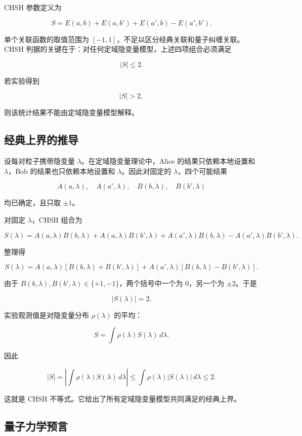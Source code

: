 \documentclass{zjureport}
\begin{document}
CHSH 参数定义为

\[
S=E(a,b)+E(a,b')+E(a',b)-E(a',b').
\]

单个关联函数的取值范围为 \([-1,1]\)，不足以区分经典关联和量子纠缠关联。CHSH 判据的关键在于：对任何定域隐变量模型，上述四项组合必须满足

\[
|S|\leq 2.
\]

若实验得到

\[
|S|>2,
\]

则该统计结果不能由定域隐变量模型解释。

\subsection{经典上界的推导}\label{ux7ecfux5178ux4e0aux754cux7684ux63a8ux5bfc}

设每对粒子携带隐变量 \(\lambda\)。在定域隐变量理论中，Alice 的结果只依赖本地设置和 \(\lambda\)，Bob 的结果也只依赖本地设置和 \(\lambda\)。因此对固定的 \(\lambda\)，四个可能结果

\[
A(a,\lambda),\quad A(a',\lambda),\quad B(b,\lambda),\quad B(b',\lambda)
\]

均已确定，且只取 \(\pm1\)。

对固定 \(\lambda\)，CHSH 组合为

\[
S(\lambda)
=A(a,\lambda)B(b,\lambda)
+A(a,\lambda)B(b',\lambda)
+A(a',\lambda)B(b,\lambda)
-A(a',\lambda)B(b',\lambda).
\]

整理得

\[
S(\lambda)
=A(a,\lambda)\left[B(b,\lambda)+B(b',\lambda)\right]
+A(a',\lambda)\left[B(b,\lambda)-B(b',\lambda)\right].
\]

由于 \(B(b,\lambda),B(b',\lambda)\in\{+1,-1\}\)，两个括号中一个为 \(0\)，另一个为 \(\pm2\)。于是

\[
|S(\lambda)|=2.
\]

实验观测值是对隐变量分布 \(\rho(\lambda)\) 的平均：

\[
S=\int \rho(\lambda)S(\lambda)\,d\lambda.
\]

因此

\[
|S|
=\left|\int \rho(\lambda)S(\lambda)\,d\lambda\right|
\leq \int \rho(\lambda)|S(\lambda)|\,d\lambda
\leq 2.
\]

这就是 CHSH 不等式。它给出了所有定域隐变量模型共同满足的经典上界。

\subsection{量子力学预言}\label{ux91cfux5b50ux529bux5b66ux9884ux8a00}
\end{document}
